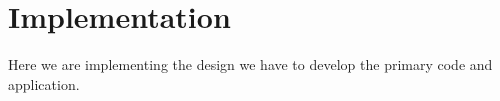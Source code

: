 \chapter{Implementation}
\label{chap:implementation}

Here we are implementing the design we have to develop the primary code and application.
